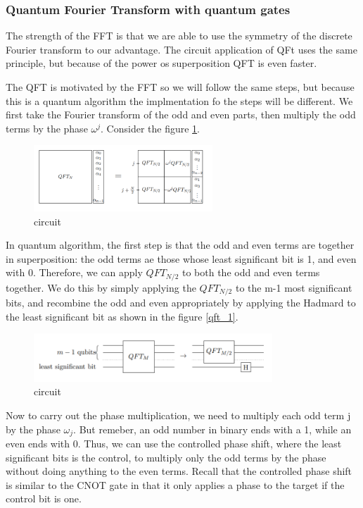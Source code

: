 \documentclass[12pt, oneside]{book}
\theoremstyle{definition}
\theoremstyle{definition}
\theoremstyle{remark}
\begin{document}
\subsubsection{Quantum Fourier Transform with quantum gates}
The strength of the FFT is that we are able to use the symmetry of the discrete Fourier transform to our advantage.
The circuit application of QFt uses the same principle, but because of the power os superposition QFT is even faster.

The QFT is motivated by the FFT so we will follow the same steps, but because this is a quantum algorithm the implmentation fo the steps will be different. 
We first take the Fourier transform of the odd and even parts, then multiply the odd terms by the phase $\omega^j$.
Consider the figure \ref{fig:qtf_final}.
\begin{figure}[H]
    \centering
    \includegraphics[width=0.6\textwidth]{../images/qft_final.png}
    \caption{circuit}
    \label{fig:qtf_final}
\end{figure}
In quantum algorithm, the first step is that the odd and even terms are together in superposition: the odd terms ae those 
whose least significant bit is 1, and even with 0. Therefore, we can apply $QFT_{N/2}$ to both the odd and even terms together.
We do this by simply applying the $QFT_{N/2}$ to the m-1 most significant bits, and recombine the odd and even appropriately by 
applying the Hadmard to the least significant bit as shown in the figure \ref{qft_1}.
\begin{figure}[H]
    \centering
    \includegraphics[width=0.8\textwidth]{../images/qft_1.png}
    \caption{circuit}
    \label{fig:qft_1}
\end{figure}

Now to carry out the phase multiplication, we need to multiply each odd term j by the phase $\omega_j$. But remeber, an odd number in binary ends with a 1, while an even ends with 0.
Thus, we can use the controlled phase shift, where the least significant bits is the control, to multiply only the odd terms by the phase without doing anything to the even terms. 
Recall that the controlled phase shift is similar to the CNOT gate in that it only applies a phase to the target if the control bit is one.
\end{document}
